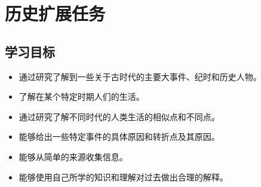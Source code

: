 \chapter{历史扩展任务}

\section{学习目标}
  \begin{itemize}
      \item 通过研究了解到一些关于古时代的主要大事件、纪时和历史人物。
      \item 了解在某个特定时期人们的生活。
      \item 通过研究了解不同时代的人类生活的相似点和不同点。
      \item 能够给出一些特定事件的具体原因和转折点及其原因。
      \item 能够从简单的来源收集信息。      
      \item 能够使用自己所学的知识和理解对过去做出合理的解释。
  \end{itemize}

